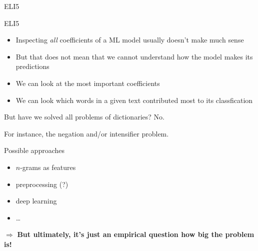 \documentclass[compress]{beamer}
\begin{document}
\begin{frame}{ELI5}
\end{frame}

\begin{frame}{ELI5}
	\begin{itemize}
		\item Inspecting \emph{all} coefficients of a ML model usually doesn't make much sense
		\item But that does not mean that we cannot understand how the model makes its predictions
		\item We can look at the most important coefficients
		\item We can look which words in a given text contributed most to its classfication
	\end{itemize}
\end{frame}




\begin{frame}{But have we solved all problems of dictionaries?}
	No.
	
	For instance, the negation and/or intensifier problem.
	
	Possible approaches
	\begin{itemize}
		\item $n$-grams as features
		\item preprocessing (?)
		\item deep learning 
		\item \ldots
	\end{itemize}
	\pause
	
	$\Rightarrow$ \textbf{But ultimately, it's just an empirical question how big the problem is!}
	
	
\end{frame}
\end{document}
